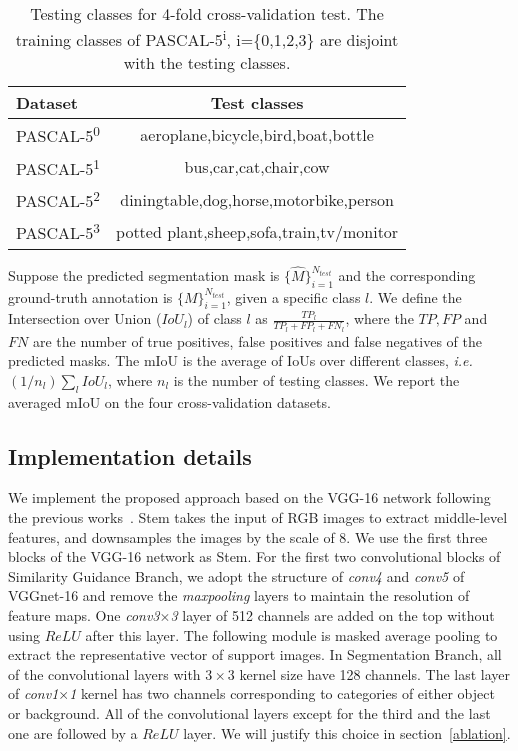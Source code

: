 \documentclass[journal]{IEEEtran}
\newcommand{\ie}{\emph{i.e.}}
\begin{document}
\begin{table}[t]\setlength{\tabcolsep}{19.5pt}
  \centering
  \caption{Testing classes for 4-fold cross-validation test. The training classes of PASCAL-5\textsuperscript{i}, i=\{0,1,2,3\} are disjoint with the testing classes.}\label{tab1}
  \begin{tabular}{l|c}
    \hline
    \hline
    \textbf{Dataset} & \textbf{Test classes} \\
    \hline
    PASCAL-5\textsuperscript{0} & aeroplane,bicycle,bird,boat,bottle \\
PASCAL-5\textsuperscript{1} & bus,car,cat,chair,cow \\
PASCAL-5\textsuperscript{2} & diningtable,dog,horse,motorbike,person \\
PASCAL-5\textsuperscript{3} & potted plant,sheep,sofa,train,tv/monitor \\
    \hline
    \hline
  \end{tabular}
  \vspace{-10pt}
\end{table}

Suppose the predicted segmentation mask is $\{\hat{M}\}_{i=1}^{N_{test}}$ and the corresponding ground-truth annotation is $\{M\}_{i=1}^{N_{test}}$, given a specific class $l$.
We define the Intersection over Union ($IoU_l$) of class $l$ as $\frac{TP_l}{TP_l+FP_l+FN_l}$, where the $TP, FP$ and $FN$ are the number of true positives, false positives and false negatives of the predicted masks.
The mIoU is the average of IoUs over different classes, \ie $(1/n_l)\sum_l IoU_l$, where $n_l$ is the number of testing classes.
We report the averaged mIoU on the four cross-validation datasets.

\subsection{Implementation details}
We implement the proposed approach based on the VGG-16 network following the previous works~\cite{shaban2017one,rakelly2018conditional}.
Stem takes the input of RGB images to extract middle-level features, and downsamples the images by the scale of 8.
We use the first three blocks of the VGG-16 network as Stem.
For the first two convolutional blocks of Similarity Guidance Branch, we adopt the structure of \textit{conv4} and \textit{conv5} of VGGnet-16 and remove the \textit{maxpooling} layers to maintain the resolution of feature maps.
One \textit{conv3$\times$3} layer of 512 channels are added on the top without using $ReLU$ after this layer. 
The following module is masked average pooling to extract the representative vector of support images.
In Segmentation Branch, all of the convolutional layers with $3 \times 3$ kernel size have 128 channels.
The last layer of \textit{conv1$\times$1} kernel has two channels corresponding to categories of either object or background. 
All of the convolutional layers except for the third and the last one are followed by a $ReLU$ layer.
We will justify this choice in section~\ref{ablation}.
\end{document}
